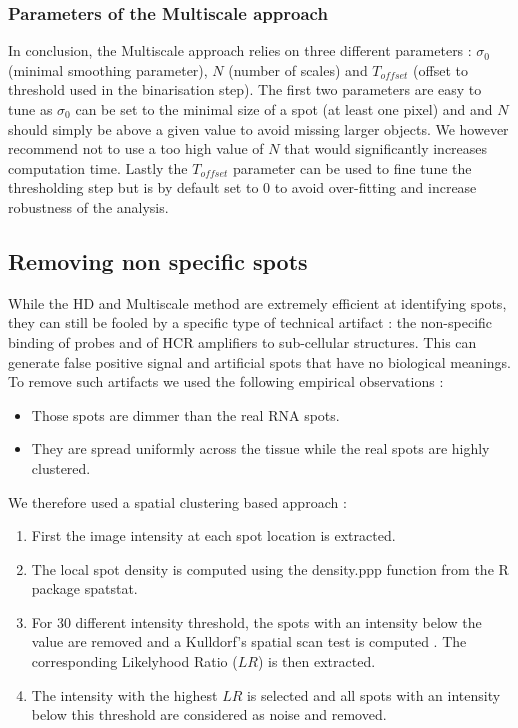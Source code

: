 \documentclass[12pt]{article}
\begin{document}
\subsubsection{Parameters of the Multiscale approach}

In conclusion, the Multiscale approach relies on three different parameters : $\sigma_{0}$ (minimal smoothing parameter), $N$ (number of scales) and $T_{offset}$ (offset to threshold used in the binarisation step). The first two parameters are easy to tune as   $\sigma_{0}$ can be set to the minimal size of a spot (at least one pixel) and and $N$ should simply be above a given value to avoid missing larger objects. We however recommend not to use a too high value of $N$ that would significantly increases computation time. Lastly the $T_{offset}$  parameter can be used to fine tune the thresholding step but is by default set to 0 to avoid over-fitting and increase robustness of the analysis.


\subsection{Removing non specific spots}

While the HD and Multiscale method are extremely efficient at identifying spots, they can still be fooled by a specific type of technical artifact : the non-specific  binding of  probes and of HCR amplifiers to sub-cellular structures. This can generate false positive signal and artificial spots that have no biological meanings.
To remove such artifacts we used the following empirical observations :
\begin{itemize}
\item Those spots are dimmer than the real RNA spots.
\item They are spread uniformly across the tissue while the real spots are highly clustered. 
\end{itemize}

We therefore used a spatial clustering based approach :
\begin{enumerate}
\item First the image intensity at each spot location is extracted.
\item The local spot density is computed using the density.ppp function from the R package spatstat.
\item For 30 different intensity threshold, the spots with an intensity below the value are removed and a Kulldorf's spatial scan test is computed \citep{kulldorff_spatial_1997}. The corresponding Likelyhood Ratio ($LR$) is then extracted.
\item The intensity with the highest $LR$ is selected and all spots with an intensity below this threshold are considered as noise and removed.
\end{enumerate}
\end{document}
